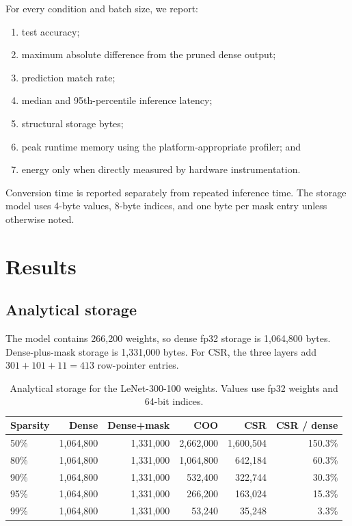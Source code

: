\documentclass[11pt]{article}
\begin{document}
For every condition and batch size, we report:
\begin{enumerate}
    \item test accuracy;
    \item maximum absolute difference from the pruned dense output;
    \item prediction match rate;
    \item median and 95th-percentile inference latency;
    \item structural storage bytes;
    \item peak runtime memory using the platform-appropriate profiler; and
    \item energy only when directly measured by hardware instrumentation.
\end{enumerate}

Conversion time is reported separately from repeated inference time.  The
storage model uses 4-byte values, 8-byte indices, and one byte per mask entry
unless otherwise noted.

\section{Results}

\subsection{Analytical storage}

The model contains 266,200 weights, so dense fp32 storage is 1,064,800 bytes.
Dense-plus-mask storage is 1,331,000 bytes.  For CSR, the three layers add
$301+101+11=413$ row-pointer entries.

\begin{table}[ht]
\centering
\caption{Analytical storage for the LeNet-300-100 weights. Values use fp32
weights and 64-bit indices.}
\label{tab:storage}
\begin{tabular}{lrrrrr}
\toprule
Sparsity & Dense & Dense+mask & COO & CSR & CSR / dense \\
\midrule
50\% & 1,064,800 & 1,331,000 & 2,662,000 & 1,600,504 & 150.3\% \\
80\% & 1,064,800 & 1,331,000 & 1,064,800 & 642,184 & 60.3\% \\
90\% & 1,064,800 & 1,331,000 & 532,400 & 322,744 & 30.3\% \\
95\% & 1,064,800 & 1,331,000 & 266,200 & 163,024 & 15.3\% \\
99\% & 1,064,800 & 1,331,000 & 53,240 & 35,248 & 3.3\% \\
\bottomrule
\end{tabular}
\end{table}
\end{document}
